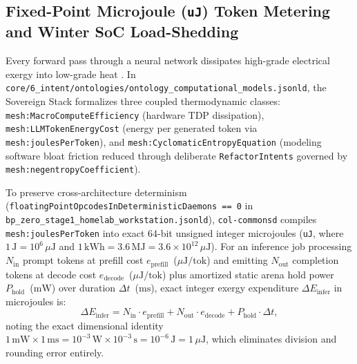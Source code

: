 \subsection{Fixed-Point Microjoule (\texttt{uJ}) Token Metering and Winter SoC Load-Shedding}
\label{subsec:exergy-metering-shedding}

Every forward pass through a neural network dissipates high-grade electrical exergy into low-grade heat \parencite{georgescu1971}. In \texttt{core/6\_intent/ontologies/ontology\_computational\_models.jsonld}, the Sovereign Stack formalizes three coupled thermodynamic classes: \texttt{mesh:MacroComputeEfficiency} (hardware TDP dissipation), \texttt{mesh:LLMTokenEnergyCost} (energy per generated token via \texttt{mesh:joulesPerToken}), and \texttt{mesh:CyclomaticEntropyEquation} (modeling software bloat friction reduced through deliberate \texttt{RefactorIntents} governed by \texttt{mesh:negentropyCoefficient}).

To preserve cross-architecture determinism (\texttt{floatingPointOpcodesInDeterministicDaemons == 0} in \texttt{bp\_zero\_stage1\_homelab\_workstation.jsonld}), \texttt{col-commonsd} compiles \texttt{mesh:joulesPerToken} into exact 64-bit unsigned integer microjoules (\texttt{uJ}, where $1\,\mathrm{J} = 10^6\,\mu\mathrm{J}$ and $1\,\mathrm{kWh} = 3.6\,\mathrm{MJ} = 3.6 \times 10^{12}\,\mu\mathrm{J}$). For an inference job processing $N_{\mathrm{in}}$ prompt tokens at prefill cost $e_{\mathrm{prefill}}$~($\mu\mathrm{J/tok}$) and emitting $N_{\mathrm{out}}$ completion tokens at decode cost $e_{\mathrm{decode}}$~($\mu\mathrm{J/tok}$) plus amortized static arena hold power $P_{\mathrm{hold}}$~($\mathrm{mW}$) over duration $\Delta t$~($\mathrm{ms}$), exact integer exergy expenditure $\Delta E_{\mathrm{infer}}$ in microjoules is:
\begin{equation}
\Delta E_{\mathrm{infer}} = N_{\mathrm{in}} \cdot e_{\mathrm{prefill}} + N_{\mathrm{out}} \cdot e_{\mathrm{decode}} + P_{\mathrm{hold}} \cdot \Delta t,
\label{eq:exact-uj-inference}
\end{equation}
noting the exact dimensional identity $1\,\mathrm{mW} \times 1\,\mathrm{ms} = 10^{-3}\,\mathrm{W} \times 10^{-3}\,\mathrm{s} = 10^{-6}\,\mathrm{J} = 1\,\mu\mathrm{J}$, which eliminates division and rounding error entirely.

